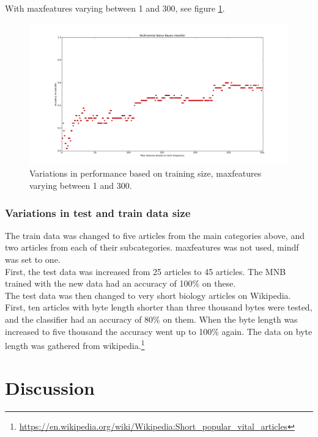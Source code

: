 \documentclass[a4paper]{article}
\begin{document}
\noindent With max\textunderscore features varying between 1 and 300, see figure \ref{fig:MNB_third}.

\begin{figure}[h!]
  \centering
    \includegraphics[width=1.0\textwidth]{MNB_third}
  \caption{Variations in performance based on training size, max\textunderscore features varying between 1 and 300.}
  \label{fig:MNB_third}
\end{figure}

\subsubsection{Variations in test and train data size}

\noindent The train data was changed to five articles from the main categories above, and two articles from each of their subcategories. max\textunderscore features was not used, min\textunderscore df was set to one.\\

\noindent First, the test data was increased from 25 articles to 45 articles. The MNB trained with the new data had an accuracy of 100\% on these.\\

\noindent The test data was then changed to very short biology articles on Wikipedia. First, ten articles with byte length shorter than three thousand bytes were tested, and the classifier had an accuracy of 80\% on them. When the byte length was increased to five thousand the accuracy went up to 100\% again.
\noindent The data on byte length was gathered from wikipedia.\footnote{\url{https://en.wikipedia.org/wiki/Wikipedia:Short_popular_vital_articles}}


\section{Discussion}
\end{document}
